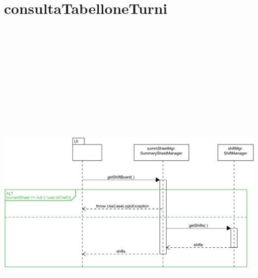 \section{consultaTabelloneTurni}
\centering\includegraphics[max width=\textwidth, max height=190mm]{../resources/img/GCC/DSD/op4.png}

